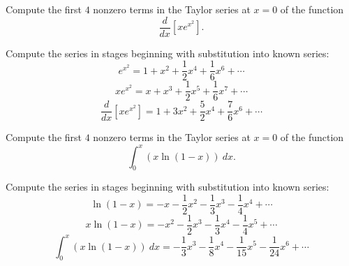\documentclass{ximera}
\begin{document}
\begin{question}%

Compute the first \(4\) nonzero terms in the Taylor series 
at \(x=0\) of the function \[\frac{d}{dx} \left[ x e^{x^2} \right].\]
\begin{multiplechoice}
\end{multiplechoice}
\begin{feedback}
Compute the series in stages beginning with substitution into known series:
\[e^{x^2} = 1 + x^{2} + \frac{1}{2}x^{4} + \frac{1}{6}x^{6} + \cdots \]
\[x e^{x^2} = x + x^{3} + \frac{1}{2}x^{5} + \frac{1}{6}x^{7} + \cdots \]
\[\frac{d}{dx} \left[ x e^{x^2} \right] = 1 + 3x^{2} + \frac{5}{2}x^{4} + \frac{7}{6}x^{6} + \cdots \]
\end{feedback}

\end{question}

\begin{question}%

Compute the first \(4\) nonzero terms in the Taylor series 
at \(x=0\) of the function \[\int_0^x \left( x \ln (1-x) \right) ~ dx.\]
\begin{multiplechoice}
\end{multiplechoice}
\begin{feedback}
Compute the series in stages beginning with substitution into known series:
\[\ln (1-x) =  - x - \frac{1}{2}x^{2} - \frac{1}{3}x^{3} - \frac{1}{4}x^{4} + \cdots \]
\[x \ln (1-x) =  - x^{2} - \frac{1}{2}x^{3} - \frac{1}{3}x^{4} - \frac{1}{4}x^{5} + \cdots \]
\[\int_0^x \left( x \ln (1-x) \right) ~ dx =  - \frac{1}{3}x^{3} - \frac{1}{8}x^{4} - \frac{1}{15}x^{5} - \frac{1}{24}x^{6} + \cdots \]
\end{feedback}

\end{question}
\end{document}
